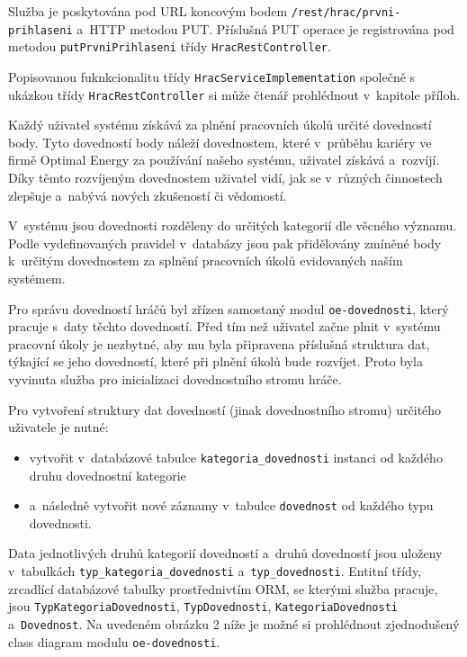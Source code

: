 \documentclass[twoside, 12pt]{article}
\begin{document}
{Služba je poskytována pod URL koncovým bodem \texttt{/rest/hrac/prvni-prihlaseni} a~HTTP metodou PUT.
Příslušná PUT operace je registrována pod metodou \texttt{putPrvniPrihlaseni} třídy \texttt{HracRestController}.

Popisovanou fuknkcionalitu třídy \texttt{HracServiceImplementation} společně s ukázkou třídy \texttt{HracRestController}
si může čtenář prohlédnout v~kapitole příloh.

\clearpage


Každý uživatel systému získává za plnění pracovních úkolů určité dovedností body.
Tyto dovedností body náleží dovednostem, které v~průběhu kariéry ve firmě Optimal Energy za používání našeho systému,
uživatel získává a~rozvíjí.
Díky těmto rozvíjeným dovednostem uživatel vidí,
jak se v~různých činnostech zlepšuje a~nabývá nových zkušeností či vědomostí.

V~systému jsou dovednosti rozděleny do určitých kategorií dle věcného významu.
Podle vydefinovaných pravidel v~databázy jsou pak přidělovány
zmíněné body k~určitým dovednostem za splnění pracovních úkolů evidovaných naším systémem.

Pro správu dovedností hráčů byl zřízen samostaný modul \texttt{oe-dovednosti},
který pracuje s~daty těchto dovedností.
Před tím než uživatel začne plnit v~systému pracovní úkoly je nezbytné,
aby mu byla připravena příslušná struktura dat, týkající se jeho dovedností,
které při plnění úkolů bude rozvíjet.
Proto byla vyvinuta služba pro inicializaci dovednostního stromu hráče.

Pro vytvoření struktury dat dovedností (jinak dovednostního stromu) určitého uživatele je nutné:

\begin{itemize}

\item vytvořit v~databázové tabulce \texttt{kategoria\_dovednosti} instanci od každého druhu dovednostní kategorie
\item  a~následně vytvořit nové záznamy v~tabulce \texttt{dovednost} od každého typu dovednosti.
\end{itemize}

Data jednotlivých druhů kategorií dovedností a~druhů dovedností jsou
uloženy v~tabulkách \texttt{typ\_kategoria\_dovednosti} a~\texttt{typ\_dovednosti}.
Entitní třídy, zrcadlící databázové tabulky prostřednivtím ORM, se kterými služba pracuje,
jsou \texttt{TypKategoriaDovednosti}, \texttt{TypDovednosti}, \texttt{KategoriaDovednosti} a~\texttt{Dovednost}.
Na uvedeném obrázku 2 níže je možné si prohlédnout zjednodušený class diagram modulu \texttt{oe-dovednosti}.

}
\end{document}

